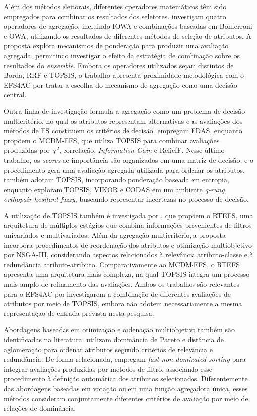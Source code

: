 Além dos métodos eleitorais, diferentes operadores matemáticos têm sido empregados para combinar os resultados dos seletores.  investigam quatro operadores de agregação, incluindo IOWA e combinações baseadas em Bonferroni e OWA, utilizando os resultados de diferentes métodos de seleção de atributos. A proposta explora mecanismos de ponderação para produzir uma avaliação agregada, permitindo investigar o efeito da estratégia de combinação sobre os resultados do \textit{ensemble}. Embora os operadores utilizados sejam distintos de Borda, RRF e TOPSIS, o trabalho apresenta proximidade metodológica com o EFS4AC por tratar a escolha do mecanismo de agregação como uma decisão central.

Outra linha de investigação formula a agregação como um problema de decisão multicritério, no qual os atributos representam alternativas e as avaliações dos métodos de FS constituem os critérios de decisão.  empregam EDAS, enquanto  propõem o MCDM-EFS, que utiliza TOPSIS para combinar avaliações produzidas por $\chi^2$, correlação, \textit{Information Gain} e ReliefF. Nesse último trabalho, os \textit{scores} de importância são organizados em uma matriz de decisão, e o procedimento gera uma avaliação agregada utilizada para ordenar os atributos.  também adotam TOPSIS, incorporando ponderação baseada em entropia, enquanto  exploram TOPSIS, VIKOR e CODAS em um ambiente \textit{q-rung orthopair hesitant fuzzy}, buscando representar incertezas no processo de decisão.

A utilização de TOPSIS também é investigada por , que propõem o RTEFS, uma arquitetura de múltiplos estágios que combina informações provenientes de filtros univariados e multivariados. Além da agregação multicritério, a proposta incorpora procedimentos de reordenação dos atributos e otimização multiobjetivo por NSGA-III, considerando aspectos relacionados à relevância atributo-classe e à redundância atributo-atributo. Comparativamente ao MCDM-EFS, o RTEFS apresenta uma arquitetura mais complexa, na qual TOPSIS integra um processo mais amplo de refinamento das avaliações. Ambos os trabalhos são relevantes para o EFS4AC por investigarem a combinação de diferentes avaliações de atributos por meio de TOPSIS, embora não adotem necessariamente a mesma representação de entrada prevista nesta pesquisa.

Abordagens baseadas em otimização e ordenação multiobjetivo também são identificadas na literatura.  utilizam dominância de Pareto e distância de aglomeração para ordenar atributos segundo critérios de relevância e redundância. De forma relacionada,  empregam \textit{fast non-dominated sorting} para integrar avaliações produzidas por métodos de filtro, associando esse procedimento à definição automática dos atributos selecionados. Diferentemente das abordagens baseadas em votação ou em uma função agregadora única, esses métodos consideram conjuntamente diferentes critérios de avaliação por meio de relações de dominância.

